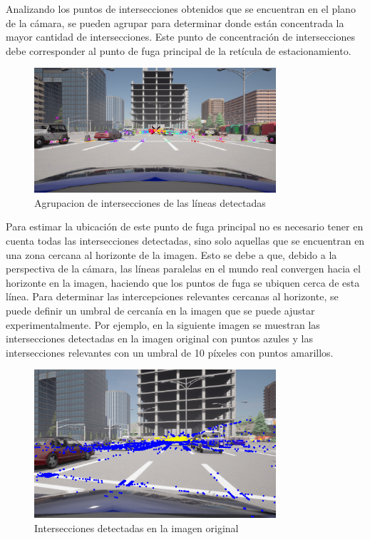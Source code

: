 \begin{itemize}
    Analizando los puntos de intersecciones obtenidos que se encuentran en el plano de la cámara, se pueden agrupar para determinar donde están
    concentrada la mayor cantidad de intersecciones.
    Este punto de concentración de intersecciones debe corresponder al punto de fuga principal de la retícula de estacionamiento.\\
    
    \begin{figure}[!ht]
        \centering
        \includegraphics[width=0.8\textwidth]{img/reticule/svd-km}
        \caption{Agrupacion de intersecciones de las líneas detectadas}
        \label{fig:intersections}
    \end{figure}
    
    Para estimar la ubicación de este punto de fuga principal no es necesario tener en cuenta todas las intersecciones detectadas,
    sino solo aquellas que se encuentran en una zona cercana al horizonte de la imagen.
    Esto se debe a que, debido a la perspectiva de la cámara, las líneas paralelas en el mundo real convergen hacia el horizonte en la imagen,
    haciendo que los puntos de fuga se ubiquen cerca de esta línea.
    Para determinar las intercepciones relevantes cercanas al horizonte, se puede definir un umbral de cercanía en la imagen que se puede ajustar experimentalmente.
    Por ejemplo, en la siguiente imagen se muestran las intersecciones detectadas en la imagen original con puntos azules
    y las intersecciones relevantes con un umbral de 10 píxeles con puntos amarillos.
    \begin{figure}[!ht]
        \centering
        \includegraphics[width=0.8\textwidth]{img/reticule/relevantInter}
        \caption{Intersecciones detectadas en la imagen original}
        \label{fig:relevantInter}
    \end{figure}


\end{itemize}
